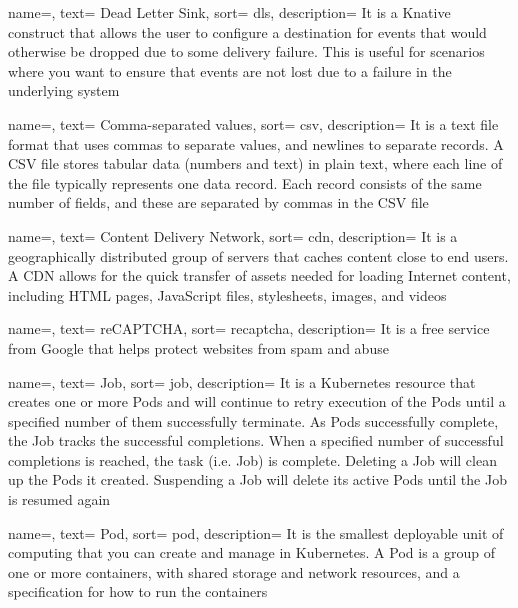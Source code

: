 {
  name=,
  text= Dead Letter Sink,
  sort= dls,
  description= {It is a Knative construct that allows the user to configure a destination for events that would otherwise be dropped due to some delivery failure. This is useful for scenarios where you want to ensure that events are not lost due to a failure in the underlying system}
}

{
  name=,
  text= Comma-separated values,
  sort= csv,
  description= {It is a text file format that uses commas to separate values, and newlines to separate records. A CSV file stores tabular data (numbers and text) in plain text, where each line of the file typically represents one data record. Each record consists of the same number of fields, and these are separated by commas in the CSV file}
}

{
  name=,
  text= Content Delivery Network,
  sort= cdn,
  description= {It is a geographically distributed group of servers that caches content close to end users. A CDN allows for the quick transfer of assets needed for loading Internet content, including HTML pages, JavaScript files, stylesheets, images, and videos}
}

{
  name=,
  text= reCAPTCHA,
  sort= recaptcha,
  description= {It is a free service from Google that helps protect websites from spam and abuse}
}

{
  name=,
  text= Job,
  sort= job,
  description= {It is a Kubernetes resource that creates one or more Pods and will continue to retry execution of the Pods until a specified number of them successfully terminate. As Pods successfully complete, the Job tracks the successful completions. When a specified number of successful completions is reached, the task (i.e. Job) is complete. Deleting a Job will clean up the Pods it created. Suspending a Job will delete its active Pods until the Job is resumed again}
}

{
  name=,
  text= Pod,
  sort= pod,
  description= {It is the smallest deployable unit of computing that you can create and manage in Kubernetes. A Pod is a group of one or more containers, with shared storage and network resources, and a specification for how to run the containers}
}

